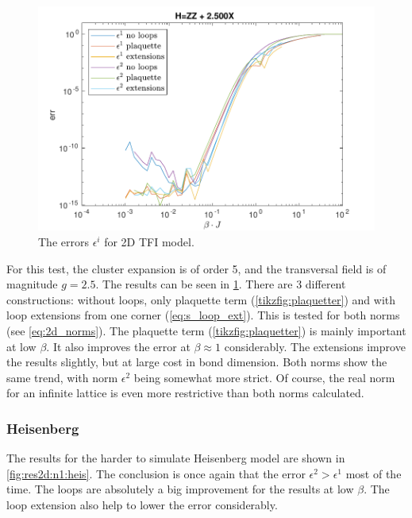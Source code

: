 \begin{figure}[!htbp]
  \center
  \includegraphics[width=\textwidth]{Figuren/benchmarking/2D_Err01_t_sing.pdf}
  \caption{The errors $\epsilon^i$ for 2D \Gls{TFI} model. }
  \label{fig:res2d:n1:tising}
\end{figure}

For this test, the cluster expansion is of order 5, and the transversal field is of magnitude $g=2.5$. The results can be seen in \cref{fig:res2d:n1:tising}.
There are 3 different constructions: without loops, only plaquette term (\cref{tikzfig:plaquetter}) and with loop extensions from one corner (\cref{eq:s_loop_ext}). This is tested for both norms (see \cref{eq:2d_norms}).
The plaquette term (\cref{tikzfig:plaquetter}) is mainly important at low $\beta$. It also improves the error at $\beta \approx 1$ considerably. The extensions improve the results slightly, but at large cost in bond dimension.
Both norms show the same trend, with norm $\epsilon^2$ being somewhat more strict. Of course, the real norm for an infinite lattice is even more restrictive than both norms calculated.

\subsubsection{Heisenberg}

The results for the harder to simulate Heisenberg model are shown in \cref{fig:res2d:n1:heis}. The conclusion is once again that the error $\epsilon^2 > \epsilon^1$ most of the time. The loops are absolutely a big improvement for  the results at low $\beta$. The loop extension also help to lower the error considerably.

